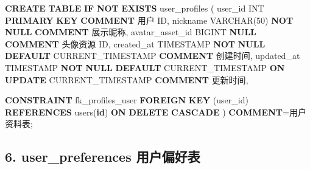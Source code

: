 \documentclass[
  a4paper,
  UTF8]{ctexart}
\newenvironment{Shaded}{}{}
\newcommand{\ControlFlowTok}[1]{\textcolor[rgb]{0.00,0.44,0.13}{\textbf{#1}}}
\newcommand{\DataTypeTok}[1]{\textcolor[rgb]{0.56,0.13,0.00}{#1}}
\newcommand{\DecValTok}[1]{\textcolor[rgb]{0.25,0.63,0.44}{#1}}
\newcommand{\FunctionTok}[1]{\textcolor[rgb]{0.02,0.16,0.49}{#1}}
\newcommand{\KeywordTok}[1]{\textcolor[rgb]{0.00,0.44,0.13}{\textbf{#1}}}
\newcommand{\NormalTok}[1]{#1}
\newcommand{\OperatorTok}[1]{\textcolor[rgb]{0.40,0.40,0.40}{#1}}
\newcommand{\StringTok}[1]{\textcolor[rgb]{0.25,0.44,0.63}{#1}}
\begin{document}
\begin{Shaded}
\begin{Highlighting}[]
\KeywordTok{CREATE} \KeywordTok{TABLE} \ControlFlowTok{IF} \KeywordTok{NOT} \KeywordTok{EXISTS}\NormalTok{ user\_profiles (}
\NormalTok{  user\_id }\DataTypeTok{INT} \KeywordTok{PRIMARY} \KeywordTok{KEY} \KeywordTok{COMMENT} \StringTok{\textquotesingle{}用户 ID\textquotesingle{}}\NormalTok{,}
\NormalTok{  nickname }\DataTypeTok{VARCHAR}\NormalTok{(}\DecValTok{50}\NormalTok{) }\KeywordTok{NOT} \KeywordTok{NULL} \KeywordTok{COMMENT} \StringTok{\textquotesingle{}展示昵称\textquotesingle{}}\NormalTok{,}
\NormalTok{  avatar\_asset\_id BIGINT }\KeywordTok{NULL} \KeywordTok{COMMENT} \StringTok{\textquotesingle{}头像资源 ID\textquotesingle{}}\NormalTok{,}
\NormalTok{  created\_at }\DataTypeTok{TIMESTAMP} \KeywordTok{NOT} \KeywordTok{NULL} \KeywordTok{DEFAULT} \FunctionTok{CURRENT\_TIMESTAMP} \KeywordTok{COMMENT} \StringTok{\textquotesingle{}创建时间\textquotesingle{}}\NormalTok{,}
\NormalTok{  updated\_at }\DataTypeTok{TIMESTAMP} \KeywordTok{NOT} \KeywordTok{NULL} \KeywordTok{DEFAULT} \FunctionTok{CURRENT\_TIMESTAMP} \KeywordTok{ON} \KeywordTok{UPDATE} \FunctionTok{CURRENT\_TIMESTAMP} \KeywordTok{COMMENT} \StringTok{\textquotesingle{}更新时间\textquotesingle{}}\NormalTok{,}

  \KeywordTok{CONSTRAINT}\NormalTok{ fk\_profiles\_user}
    \KeywordTok{FOREIGN} \KeywordTok{KEY}\NormalTok{ (user\_id) }\KeywordTok{REFERENCES}\NormalTok{ users(}\KeywordTok{id}\NormalTok{)}
    \KeywordTok{ON} \KeywordTok{DELETE} \KeywordTok{CASCADE}
\NormalTok{) }\KeywordTok{COMMENT}\OperatorTok{=}\StringTok{\textquotesingle{}用户资料表\textquotesingle{}}\NormalTok{;}
\end{Highlighting}
\end{Shaded}

\hypertarget{user_preferences-ux7528ux6237ux504fux597dux8868}{%
\subsection{6. user\_preferences
用户偏好表}\label{user_preferences-ux7528ux6237ux504fux597dux8868}}
\end{document}

